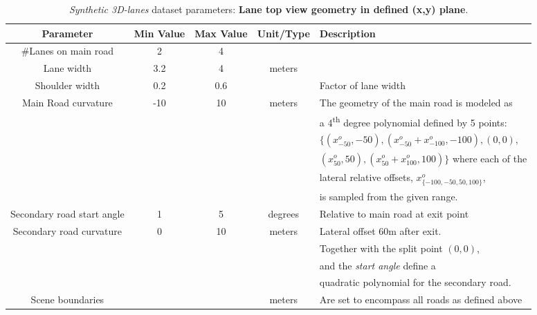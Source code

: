 \documentclass[10pt,twocolumn,letterpaper]{article}
\begin{document}
\vspace{5cm}
\begin{table*}[h]
	\centering
	\caption{\emph{Synthetic 3D-lanes} dataset parameters: \textbf{Lane top view geometry in defined (x,y) plane}.}
	\begin{tabular} {ccccl}
		\toprule
		\textbf{Parameter} &  \textbf{Min Value} &  \textbf{Max Value} & \textbf{Unit/Type} & \textbf{Description}  \\
		\toprule		
		\#Lanes on main road & 2 & 4 & & \\
		\midrule
		Lane width & 3.2 & 4 & meters& \\
		\midrule
		Shoulder width & 0.2 & 0.6 & & Factor of lane width \\
		\midrule
		
		Main Road curvature & -10& 10& meters& The geometry of the main road is modeled as \\ 
		& & & & a 4\textsuperscript{th} degree polynomial defined by 5 points: \\
		& & & & $\{(x^{o}_{-50},-50),(x^{o}_{-50}+x^{o}_{-100},-100),(0,0),$\\
		& & & & $(x^{o}_{50},50),(x^{o}_{50}+x^{o}_{100},100)\}$ where each of the \\
		& & & & lateral relative offsets, $x^{o}_{\{-100,-50,50,100\}}$, \\
		& & & & is sampled from the given range. \\
		
		\midrule
		
		Secondary road start angle & 1 & 5 & degrees & Relative to main road at exit point\\
		\midrule
		
		Secondary road curvature & 0  & 10  & meters & Lateral offset 60m after exit.\\
		& & & & Together with the split point $(0,0)$,\\
		& & & &  and the \textit{start angle} define a\\
		& & & &  quadratic polynomial for the secondary road.\\
		\midrule
		
		
		Scene boundaries & & & meters & Are set to encompass all roads as defined above\\
		\bottomrule
		
	\end{tabular} 
	\label{tab:real}
\end{table*}
\vspace{5cm}
\end{document}
